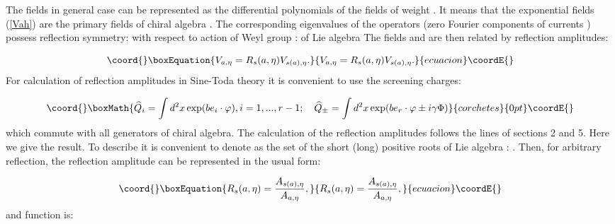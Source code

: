 \documentclass[a4paper,12pt]{article}
\begin{document}
The fields \coordHE{} in general case can be represented as the differential
polynomials of the fields \coordHE{} of weight 
\coordHE{}. It means that the exponential fields (\ref{Vah}) are the primary fields
of chiral algebra \coordHE{}. The corresponding eigenvalues \coordHE{}
of the operators \coordHE{} (zero Fourier components of currents \coordHE{})
possess reflection symmetry: \coordHE{} with respect to
action of Weyl group \coordHE{} : \coordHE{} of Lie
algebra \coordHE{} The fields \coordHE{} and \coordHE{} are then
related by reflection amplitudes:

\begin{equation}\coord{}\boxEquation{
V_{a,\eta }=R_s(a,\eta )V_{s(a),\eta }.  \label{Rre}
}{
V_{a,\eta }=R_s(a,\eta )V_{s(a),\eta }.  }{ecuacion}\coordE{}\end{equation}
For calculation of reflection amplitudes in Sine-Toda theory it is
convenient to use the screening charges:

\begin{displaymath}\coord{}\boxMath{
\widehat{Q}_i=\int d^2x\exp (be_i\cdot \varphi ),i=1,...,r-1;\quad \widehat{Q
}_{\pm }=\int d^2x\exp (be_r\cdot \varphi \pm i\gamma \Phi )  
}{corchetes}{0pt}\coordE{}\end{displaymath}
which commute with all generators of chiral algebra. The calculation of the
reflection amplitudes \coordHE{} follows the lines of sections 2 and 5.
Here we give the result. To describe it is convenient to denote as \coordHE{}  \coordHE{}
the set of the short (long) positive roots of Lie algebra \coordHE{}: \coordHE{}. Then, for arbitrary reflection, 
\coordHE{} the reflection amplitude can be represented in the usual form:

\begin{equation}\coord{}\boxEquation{
R_s(a,\eta )=\frac{A_{s(a),\eta }}{A_{a,\eta }},  \label{Refl}
}{
R_s(a,\eta )=\frac{A_{s(a),\eta }}{A_{a,\eta }},  }{ecuacion}\coordE{}\end{equation}
and function \coordHE{} is:
\end{document}
